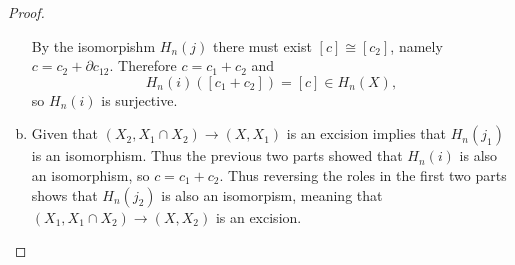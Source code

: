 \documentclass{article}
\newcommand{\ra}{\rightarrow}
\begin{document}
\begin{proof}
\begin{enumerate}[a.]
    By the isomorpishm $H_n(j)$ there must exist $[c] \cong [c_2]$, namely
    $c = c_2 + \partial c_{12}$.
    Therefore $c = c_1 + c_2$ and \[
      H_n(i)([c_1 + c_2]) = [c] \in H_n(X),
    \] so $H_n(i)$ is surjective.
    \item Given that $(X_2, X_1 \cap X_2) \ra (X, X_1)$ is an excision implies
    that $H_n(j_1)$ is an isomorphism. Thus the previous two parts showed that
    $H_n(i)$ is also an isomorphism, so $c = c_1 + c_2$. Thus reversing the
    roles in the first two parts shows that $H_n(j_2)$ is also an isomorpism,
    meaning that $(X_1, X_1 \cap X_2) \ra (X, X_2)$ is an excision.
  \end{enumerate}
\end{proof}
\end{document}
